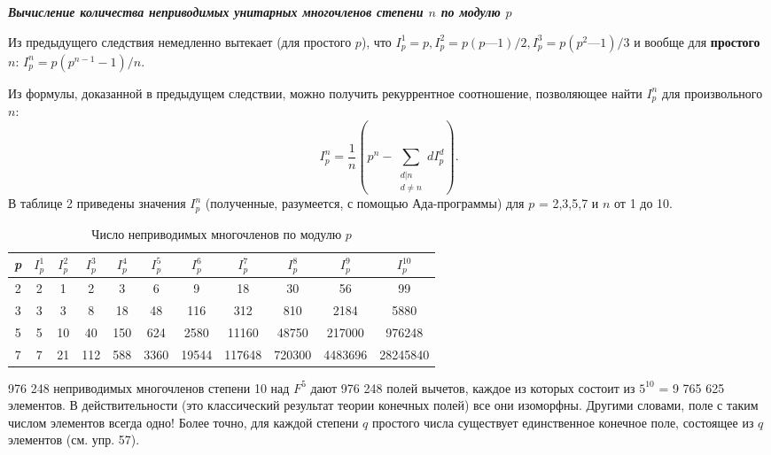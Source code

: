 \noindent\textbf{\textit{Вычисление количества неприводимых унитарных\newline 
многочленов степени $n$ по модулю $p$ }}

Из предыдущего следствия немедленно вытекает (для простого $p$), 
что $I^1_p = p, I^2_p = p(p — 1)\slash2, I^3_p = p(p^2 — 1)\slash3$ и вообще для  \textbf{простого} $n$: 
$I^n_p = p(p^{n-1} - 1)\slash n$. 

Из формулы, доказанной в предыдущем следствии, можно получить 
рекуррентное соотношение, позволяющее найти $I^n_p$ для  
произвольного $n$: 
\begin{equation*}
I^n_p = \frac{1}{n}(p^n - \sum_{\substack{d|n\\d\neq n}}dI^d_p).
\end{equation*}
В таблице 2 приведены значения $I^n_p$ (полученные, разумеется, с  
помощью Ада-программы) для $p$ = 2,3,5,7 и $n$ от 1 до 10. 

\begin{table}[h!]
\centering
\label{}
\begin{small}
\begin{tabular}{|c|cccccccccc|}
\hline
\textit{p} & $I^1_p$ & $I^2_p$ & $I^3_p$ & $I^4_p$ & $I^5_p$ & $I^6_p$ & $I^7_p$  & $I^8_p$  & $I^9_p$   & $I^{10}_p$   \\ \hline
2          & 2     & 1     & 2     & 3     & 6     & 9     & 18     & 30     & 56      & 99       \\
3          & 3     & 3     & 8     & 18    & 48    & 116   & 312    & 810    & 2184    & 5880     \\
5          & 5     & 10    & 40    & 150   & 624   & 2580  & 11160  & 48750  & 217000  & 976248   \\
7          & 7     & 21    & 112   & 588   & 3360  & 19544 & 117648 & 720300 & 4483696 & 28245840 \\ \hline
\end{tabular}
\end{small}
\caption{Число неприводимых многочленов по модулю $p$} 
\end{table}

\begin{mynotice}
976 248 неприводимых многочленов степени 10 над 
$F^5$ дают 976 248 полей вычетов, каждое из которых состоит из 
$5^{10}$ = 9 765 625 элементов. В действительности (это классический 
результат теории конечных полей) все они изоморфны. Другими 
словами, поле с таким числом элементов всегда одно! Более точно, 
для каждой степени $q$ простого числа существует единственное 
конечное поле, состоящее из $q$ элементов (см. упр. 57).\newline 
\end{mynotice}

